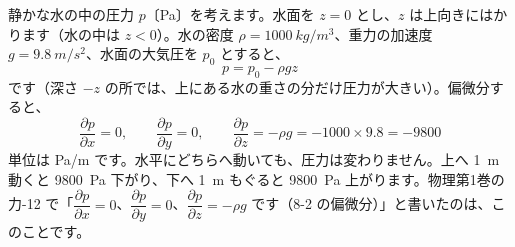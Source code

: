 静かな水の中の圧力 $p$〔Pa〕を考えます。水面を $z=0$ とし、$z$ は上向きにはかります（水の中は $z<0$）。水の密度 $\rho=\qty{1000}{kg/m^3}$、重力の加速度 $g=\qty{9.8}{m/s^2}$、水面の大気圧を $p_0$ とすると、
\[ p=p_0-\rho gz \]
です（深さ $-z$ の所では、上にある水の重さの分だけ圧力が大きい）。偏微分すると、
\[ \frac{\partial p}{\partial x}=0,\qquad \frac{\partial p}{\partial y}=0,\qquad \frac{\partial p}{\partial z}=-\rho g=-1000\times9.8=-9800 \]
単位は Pa/m です。水平にどちらへ動いても、圧力は変わりません。上へ \qty{1}{m} 動くと \qty{9800}{Pa} 下がり、下へ \qty{1}{m} もぐると \qty{9800}{Pa} 上がります。物理第1巻の力-12 で「$\dfrac{\partial p}{\partial x}=0$、$\dfrac{\partial p}{\partial y}=0$、$\dfrac{\partial p}{\partial z}=-\rho g$ です（8-2 の偏微分）」と書いたのは、このことです。

